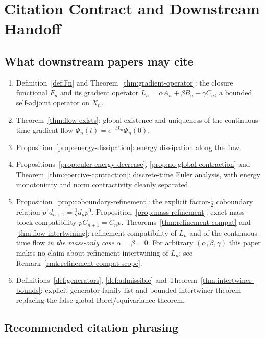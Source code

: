 \documentclass[11pt, a4paper]{amsart}
\theoremstyle{definition}
\begin{document}
\section{Citation Contract and Downstream Handoff}
\label{sec:handoff}

\subsection{What downstream papers may cite}

\begin{enumerate}
\item Definition~\ref{def:Fn} and
  Theorem~\ref{thm:gradient-operator}: the closure functional
  $F_n$ and its gradient operator $L_n = \alpha A_n + \beta B_n -
  \gamma C_n$, a bounded self-adjoint operator on $X_n$.
\item Theorem~\ref{thm:flow-exists}: global existence and
  uniqueness of the continuous-time gradient flow
  $\Phi_n(t) = e^{-t L_n} \Phi_n(0)$.
\item Proposition~\ref{prop:energy-dissipation}: energy
  dissipation along the flow.
\item Propositions~\ref{prop:euler-energy-decrease},
  \ref{prop:no-global-contraction} and
  Theorem~\ref{thm:coercive-contraction}: discrete-time Euler
  analysis, with energy monotonicity and norm contractivity
  cleanly separated.
\item Proposition~\ref{prop:coboundary-refinement}: the explicit
  factor-$\tfrac{1}{2}$ coboundary relation $p^1 d_{n+1} =
  \tfrac{1}{2} d_n p^0$. Proposition~\ref{prop:mass-refinement}:
  exact mass-block compatibility $p C_{n+1} = C_n p$.
  Theorems~\ref{thm:refinement-compat} and
  \ref{thm:flow-intertwining}: refinement compatibility of $L_n$
  and of the continuous-time flow \emph{in the mass-only case}
  $\alpha = \beta = 0$. For arbitrary $(\alpha, \beta, \gamma)$
  this paper makes no claim about refinement-intertwining of $L_n$;
  see Remark~\ref{rmk:refinement-compat-scope}.
\item Definitions~\ref{def:generators}, \ref{def:admissible} and
  Theorem~\ref{thm:intertwiner-bounds}: explicit generator-family list
  and bounded-intertwiner theorem replacing the false global
  Borel/equivariance theorem.
\end{enumerate}

\subsection{Recommended citation phrasing}
\end{document}
